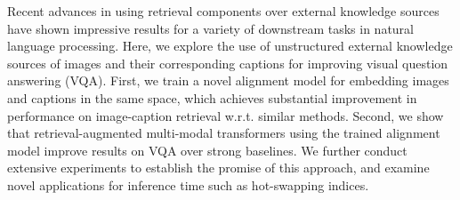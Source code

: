 Recent advances in using retrieval components over external knowledge sources have shown impressive results for a variety of downstream tasks in natural language processing. Here, we explore the use of unstructured external knowledge sources of images and their corresponding captions for improving visual question answering (VQA). First, we train a novel alignment model for embedding images and captions in the same space, which achieves substantial improvement in performance on image-caption retrieval w.r.t. similar methods. Second, we show that retrieval-augmented multi-modal transformers using the trained alignment model improve results on VQA over strong baselines. We further conduct extensive experiments to establish the promise of this approach, and examine novel applications for inference time such as hot-swapping indices.
